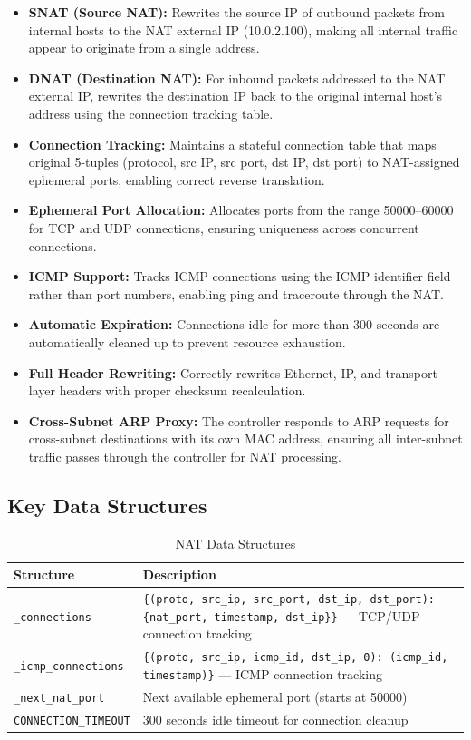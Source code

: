 \documentclass[12pt,a4paper]{article}
\begin{document}
\begin{itemize}[leftmargin=1.5cm]
    \item \textbf{SNAT (Source NAT):} Rewrites the source IP of outbound packets from internal hosts to the NAT external IP (10.0.2.100), making all internal traffic appear to originate from a single address.
    \item \textbf{DNAT (Destination NAT):} For inbound packets addressed to the NAT external IP, rewrites the destination IP back to the original internal host's address using the connection tracking table.
    \item \textbf{Connection Tracking:} Maintains a stateful connection table that maps original 5-tuples (protocol, src IP, src port, dst IP, dst port) to NAT-assigned ephemeral ports, enabling correct reverse translation.
    \item \textbf{Ephemeral Port Allocation:} Allocates ports from the range 50000--60000 for TCP and UDP connections, ensuring uniqueness across concurrent connections.
    \item \textbf{ICMP Support:} Tracks ICMP connections using the ICMP identifier field rather than port numbers, enabling ping and traceroute through the NAT.
    \item \textbf{Automatic Expiration:} Connections idle for more than 300 seconds are automatically cleaned up to prevent resource exhaustion.
    \item \textbf{Full Header Rewriting:} Correctly rewrites Ethernet, IP, and transport-layer headers with proper checksum recalculation.
    \item \textbf{Cross-Subnet ARP Proxy:} The controller responds to ARP requests for cross-subnet destinations with its own MAC address, ensuring all inter-subnet traffic passes through the controller for NAT processing.
\end{itemize}

\subsection{Key Data Structures}

\begin{table}[H]
\centering
\begin{tabular}{@{}lp{8cm}@{}}
\toprule
\textbf{Structure} & \textbf{Description} \\
\midrule
\texttt{\_connections} & \texttt{\{(proto, src\_ip, src\_port, dst\_ip, dst\_port): \{nat\_port, timestamp, dst\_ip\}\}} --- TCP/UDP connection tracking \\
\texttt{\_icmp\_connections} & \texttt{\{(proto, src\_ip, icmp\_id, dst\_ip, 0): (icmp\_id, timestamp)\}} --- ICMP connection tracking \\
\texttt{\_next\_nat\_port} & Next available ephemeral port (starts at 50000) \\
\texttt{CONNECTION\_TIMEOUT} & 300 seconds idle timeout for connection cleanup \\
\bottomrule
\end{tabular}
\caption{NAT Data Structures}
\end{table}
\end{document}
